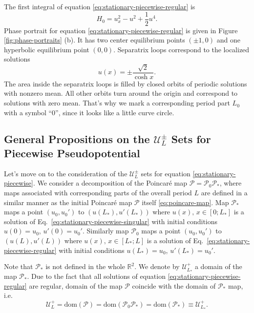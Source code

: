 The first integral of equation \eqref{eq:stationary-piecewise-regular} is
\begin{equation}
	H_0 = u_x^2 - u^2 + \frac{1}{2} u^4.
\label{eq:stationary-piecewise-regular-integral}
\end{equation}
Phase portrait for equation \eqref{eq:stationary-piecewise-regular} is given in Figure \ref{fig:phase-portraits} (b).
It has two center equilibrium points $(\pm 1, 0)$ and one hyperbolic equilibrium point $(0, 0)$.
Separatrix loops correspond to the localized solutions
\begin{equation}
	u(x) = \pm \frac{\sqrt{2}}{\cosh{x}}.
\end{equation}
The area inside the separatrix loops is filled by closed orbits of periodic solutions with nonzero mean.
All other orbits turn around the origin and correspond to solutions with zero mean.
That's why we mark a corresponding period part $L_0$ with a symbol ``$0$'', since it looks like a little curve circle.

\subsection{General Propositions on the $\mathscr{U}_L^{\pm}$ Sets for Piecewise Pseudopotential}

Let's move on to the consideration of the $\mathscr{U}_L^{\pm}$ sets for equation \eqref{eq:stationary-piecewise}.
We consider a decomposition of the Poincar\'e map $\mathcal{P} = \mathcal{P}_0 \mathcal{P}_*$, where  maps associated with corresponding parts of the overall period $L$ are defined in a similar manner as the initial Poincar\'e map $\mathcal{P}$ itself \eqref{eq:poincare-map}.
Map $\mathcal{P}_*$ maps a point $(u_0, u_0')$ to $(u(L_*), u'(L_*))$ where $u(x), \, x \in [0; L_*]$ is a solution of Eq.~\eqref{eq:stationary-piecewise-singular} with initial conditions $u(0) = u_0$, $u'(0) = u_0'$.
Similarly map $\mathcal{P}_0$ maps a point $(u_0, u_0')$ to $(u(L), u'(L))$ where $u(x), \, x \in [L_*; L]$ is a solution of Eq.~\eqref{eq:stationary-piecewise-regular} with initial conditions $u(L_*) = u_0$, $u'(L_*) = u_0'$.

Note that $\mathcal{P}_*$ is not defined in the whole $\mathbb{R}^2$.
We denote by $\mathscr{U}_{L_*}^+$ a domain of the map $\mathcal{P}_*$.
Due to the fact that all solutions of equation \eqref{eq:stationary-piecewise-regular} are regular, domain of the map $\mathcal{P}$ coincide with the domain of $\mathcal{P}_*$ map, i.e.
\begin{equation}
	\mathscr{U}_L^+ = \textrm{dom}(\mathcal{P}) = \textrm{dom}(\mathcal{P}_0 \mathcal{P}_*) = \textrm{dom}(\mathcal{P}_*) \equiv \mathscr{U}_{L_*}^+.
\end{equation}

